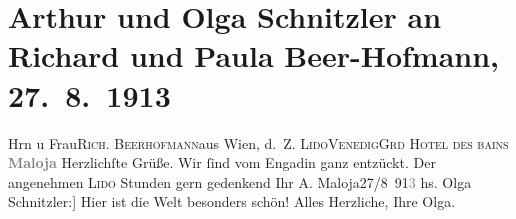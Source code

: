 

         
         \renewcommand{\erwaehntePersonen}{Personen: Richard Beer-Hofmann, Paula Beer-Hofmann, Hugo Schlagenhauff}
         \renewcommand{\erwaehnteOrte}{Orte: Engadin, Grand Hotel des Bains, Lido, Maloja, Maloja Palace, Venedig, Wien}
         \renewcommand{\erwaehnteWerke}{}
               \section[Arthur und Olga Schnitzler an Richard und Paula Beer-Hofmann, 27. 8. 1913]{ Arthur und Olga Schnitzler an Richard und Paula Beer-Hofmann,
               27. 8. 1913}\nopagebreak{}\rehead{ }\begin{ledgroupsized}[t]{13cm}\normalsize\beginnumbering \toendnotes[C]{\smallbreak\pagebreak[2]} 
\pstart{}{\pb}Hrn u Frau\pend{}\pstart{}\textsc{Rich. Beerhofmann}\pend{}\pstart{}aus Wien, \pend{}\pstart{}d. Z. \textsc{Lido}\pend{}\pstart{}\textsc{Venedig}\pend{}\pstart{}\textsc{Grd Hotel des bains}\pend{}{\bigskip}\pstart
           \noindent{}\centering{}{\pb}\textcolor{gray}{\textbf{Maloja}}\pend
           \pstart
           {\pb}Herzlichſte Grüße. Wir ſind vom Engadin ganz entzückt. Der angenehmen \textsc{Lido} Stunden gern gedenkend\pend
           \pstart Ihr \spacefill\mbox{A.}\pend{}\pstart
           Maloja27/8 91\textcolor{gray}{3}\pend
           \pstart
           \noindent{}{[}hs. Olga Schnitzler:{]} Hier ist die Welt besonders schön! Alles Herzliche,\pend
           \pstart Ihre \spacefill\mbox{Olga.}\pend{}
         
         \endnumbering{}\end{ledgroupsized}  \newcommand{\dateiname}{L02150}\newcommand{\titel}{Arthur und Olga Schnitzler an Richard und Paula Beer-Hofmann, 27. 8. 1913}\newcommand{\editorInnen}{Martin Anton Müller und Gerd-Hermann Susen}
      
